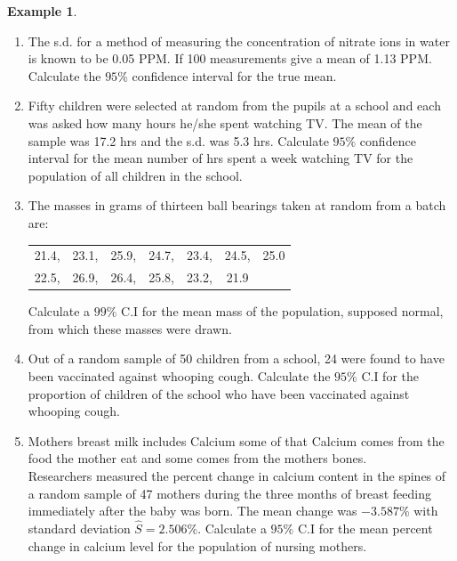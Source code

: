 \documentclass[11pt,a4paper]{article}
\theoremstyle{definition}
\newtheorem{example}[thm]{Example}
\begin{document}
\begin{example}
\begin{enumerate}
\item The s.d. for a method of measuring the concentration of nitrate ions in water is known to be 0.05 PPM. If 100 measurements give a mean of 1.13 PPM. Calculate the $95\%$ confidence interval for the true mean.
\item Fifty children were selected at random from the pupils at a school and each was asked how many hours he/she spent watching TV. The mean of the sample was 17.2 hrs and the s.d. was 5.3 hrs. Calculate $95\%$ confidence interval for the mean number of hrs spent a week watching TV for the population of all children in the school.
\item The masses in grams of thirteen ball bearings taken at random from a batch are:



\begin{table}[H]
\centering
\begin{tabular}{ccccccc}
21.4, &23.1,& 25.9,& 24.7,& 23.4,& 24.5, & 25.0\\ 22.5,&26.9,&26.4,&25.8,& 23.2,&21.9&\\
\end{tabular}
\end{table}

Calculate a $99\%$ C.I for the mean mass of the population, supposed normal, from which these masses were drawn.
\item Out of a random sample of 50 children from a school, 24 were found to have been vaccinated against whooping cough. Calculate the $95\%$ C.I for the proportion of children of the school who have been vaccinated against whooping cough.
\item Mothers breast milk includes Calcium some of that Calcium comes from the food the mother eat and some comes from the mothers bones.\\ Researchers measured the percent change in calcium content in the spines of a random sample of 47 mothers during the three months of breast feeding immediately after the baby was born. The mean change was $-3.587\%$ with standard deviation $\hat S = 2.506\%$. Calculate a $95\%$ C.I for the mean percent change in calcium level for the population of nursing mothers.\\
\end{enumerate}
\end{example}
\end{document}
